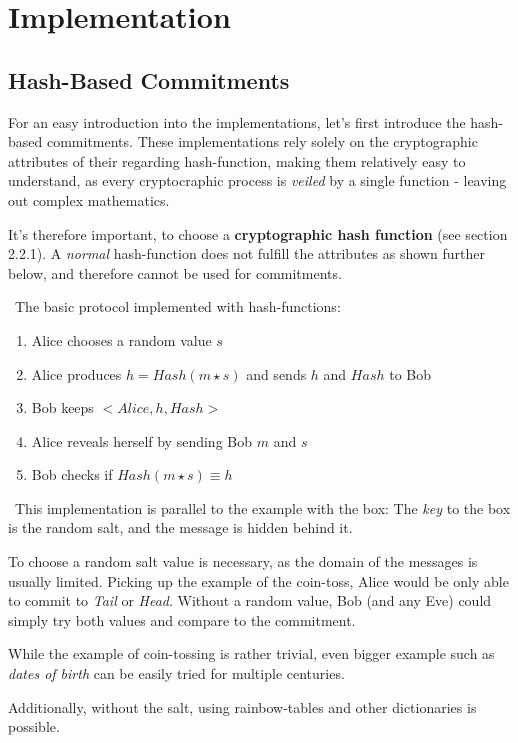 
\section{Implementation}
\subsection{Hash-Based Commitments}
For an easy introduction into the implementations, let's first introduce the hash-based commitments. 
These implementations rely solely on the cryptographic attributes of their regarding hash-function, making them relatively easy to understand, as every cryptocraphic process is \textit{veiled} by a single function - leaving out complex mathematics.

It's therefore important, to choose a \textbf{cryptographic hash function} (see \cite{DeHa15} section 2.2.1). A \textit{normal} hash-function does not fulfill the attributes as shown further below, and therefore cannot be used for commitments. 

~\newline The basic protocol implemented with hash-functions:
	\begin{enumerate}
		\item Alice chooses a random value $s$
		\item Alice produces $h = Hash(m \star s)$ and sends $h$ and $Hash$ to Bob
		\item Bob keeps $<Alice,h,Hash>$
		\item Alice reveals herself by sending Bob $m$ and $s$
		\item Bob checks if $Hash(m \star s) \equiv h$
	\end{enumerate}
~\newline This implementation is parallel to the example with the box: The \textit{key} to the box is the random salt, and the message is hidden behind it. 

To choose a random salt value is necessary, as the domain of the messages is usually limited. Picking up the example of the coin-toss, Alice would be only able to commit to \textit{Tail} or \textit{Head}. Without a random value, Bob (and any Eve) could simply try both values and compare to the commitment. 

While the example of coin-tossing is rather trivial, even bigger example such as \textit{dates of birth} can be easily tried for multiple centuries. 

Additionally, without the salt, using rainbow-tables and other dictionaries is possible. 

